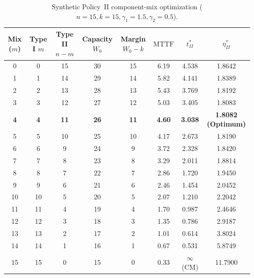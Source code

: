 \documentclass[10pt,a4paper]{article}
\begin{document}
\begin{table}[htbp]
\centering
\footnotesize
\caption{Synthetic Policy~II component-mix optimization ($n = 15, k = 15, \gamma_1 = 1.5, \gamma_2 = 0.5$).}
\label{tab:S3}
\begin{tabular*}{\textwidth}{@{\extracolsep{\fill}}cccccccc@{}}
\toprule
Mix ($m$) & Type I $m$ & Type II $n-m$ & Capacity $W_0$ & Margin $W_0-k$ & $\mathrm{MTTF}$ & $t_{II}^*$ & $\eta_{II}^*$ \\
\midrule
0  &  0 & 15 & 30 & 15 & 6.19 & 4.538 & 1.8642 \\
1  &  1 & 14 & 29 & 14 & 5.82 & 4.141 & 1.8389 \\
2  &  2 & 13 & 28 & 13 & 5.43 & 3.769 & 1.8192 \\
3  &  3 & 12 & 27 & 12 & 5.03 & 3.405 & 1.8083 \\
\textbf{4} & \textbf{4} & \textbf{11} & \textbf{26} & \textbf{11} & \textbf{4.60} & \textbf{3.038} & \textbf{1.8082 (Optimum)} \\
5  &  5 & 10 & 25 & 10 & 4.17 & 2.673 & 1.8190 \\
6  &  6 &  9 & 24 &  9 & 3.72 & 2.328 & 1.8420 \\
7  &  7 &  8 & 23 &  8 & 3.29 & 2.011 & 1.8814 \\
8  &  8 &  7 & 22 &  7 & 2.86 & 1.720 & 1.9450 \\
9  &  9 &  6 & 21 &  6 & 2.46 & 1.454 & 2.0452 \\
10 & 10 &  5 & 20 &  5 & 2.07 & 1.210 & 2.2042 \\
11 & 11 &  4 & 19 &  4 & 1.70 & 0.987 & 2.4646 \\
12 & 12 &  3 & 18 &  3 & 1.35 & 0.786 & 2.9187 \\
13 & 13 &  2 & 17 &  2 & 1.01 & 0.614 & 3.8024 \\
14 & 14 &  1 & 16 &  1 & 0.67 & 0.531 & 5.8749 \\
15 & 15 &  0 & 15 &  0 & 0.33 & $\infty$ (CM) & 11.7900 \\
\bottomrule
\end{tabular*}
\end{table}
\end{document}
